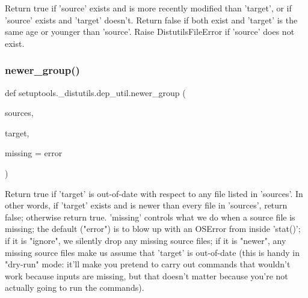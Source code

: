 \begin{DoxyVerb}Return true if 'source' exists and is more recently modified than
'target', or if 'source' exists and 'target' doesn't.  Return false if
both exist and 'target' is the same age or younger than 'source'.
Raise DistutilsFileError if 'source' does not exist.
\end{DoxyVerb}
 \mbox{\label{namespacesetuptools_1_1__distutils_1_1dep__util_aabcdb616fc98451fe469ae055c1f8f11}} 
\subsubsection{\texorpdfstring{newer\+\_\+group()}{newer\_group()}}
{\footnotesize\ttfamily def setuptools.\+\_\+distutils.\+dep\+\_\+util.\+newer\+\_\+group (\begin{DoxyParamCaption}\item[{}]{sources,  }\item[{}]{target,  }\item[{}]{missing = {\ttfamily \textquotesingle{}error\textquotesingle{}} }\end{DoxyParamCaption})}

\begin{DoxyVerb}Return true if 'target' is out-of-date with respect to any file
listed in 'sources'.  In other words, if 'target' exists and is newer
than every file in 'sources', return false; otherwise return true.
'missing' controls what we do when a source file is missing; the
default ("error") is to blow up with an OSError from inside 'stat()';
if it is "ignore", we silently drop any missing source files; if it is
"newer", any missing source files make us assume that 'target' is
out-of-date (this is handy in "dry-run" mode: it'll make you pretend to
carry out commands that wouldn't work because inputs are missing, but
that doesn't matter because you're not actually going to run the
commands).
\end{DoxyVerb}
 \mbox{\label{namespacesetuptools_1_1__distutils_1_1dep__util_a56795f3ddcbca1971c4e426bfc80c4f7}} 
